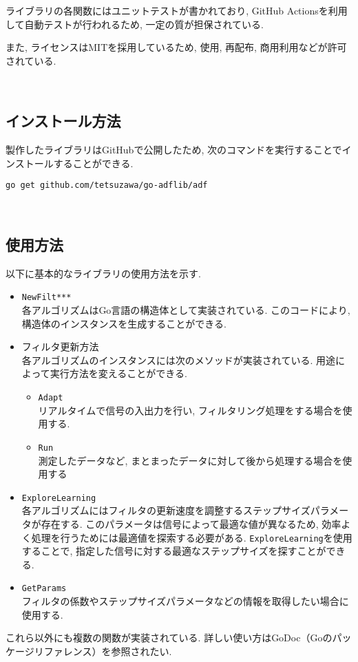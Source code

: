 ライブラリの各関数にはユニットテストが書かれており, GitHub
Actionsを利用して自動テストが行われるため, 一定の質が担保されている. 

また, ライセンスはMITを採用しているため, 使用, 再配布, 商用利用などが許可されている. %

\
\subsection{インストール方法}\label{how-to-install}

製作したライブラリはGitHub\cite{go-adflib:online}で公開したため, 次のコマンドを実行することでインストールすることができる. 

\texttt{go\ get\ github.com/tetsuzawa/go-adflib/adf}

\
\subsection{使用方法}\label{how-to-use}

以下に基本的なライブラリの使用方法を示す. 

\begin{itemize}
\tightlist
\item
  \texttt{NewFilt***} \\ 
  各アルゴリズムはGo言語の構造体として実装されている. このコードにより, 構造体のインスタンスを生成することができる. 
\item
  フィルタ更新方法 \\
  各アルゴリズムのインスタンスには次のメソッドが実装されている. 用途によって実行方法を変えることができる. 

  \begin{itemize}
  \tightlist
  \item
    \texttt{Adapt} \\
    リアルタイムで信号の入出力を行い, フィルタリング処理をする場合を使用する. 
  \item
    \texttt{Run} \\
    測定したデータなど, まとまったデータに対して後から処理する場合を使用する
  \end{itemize}
\item
  \texttt{ExploreLearning} \\
  各アルゴリズムにはフィルタの更新速度を調整するステップサイズパラメータが存在する. このパラメータは信号によって最適な値が異なるため, 効率よく処理を行うためには最適値を探索する必要がある. \texttt{ExploreLearning}を使用することで, 指定した信号に対する最適なステップサイズを探すことができる. 
\item
  \texttt{GetParams} \\
  フィルタの係数やステップサイズパラメータなどの情報を取得したい場合に使用する. 
\end{itemize}

これら以外にも複数の関数が実装されている. 詳しい使い方はGoDoc（Goのパッケージリファレンス）\cite{godoc:online}を参照されたい. 
